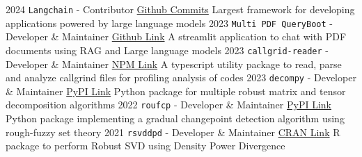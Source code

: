 \documentclass[10pt]{developercv} %
\begin{document}
\begin{entrylist}
    \entry
    {2024}
    {\texttt{Langchain} - Contributor}
    {\href{https://github.com/langchain-ai/langchain/commits?author=subroy13}{Github Commits}}
    {\small Largest framework for developing applications powered by large language models}
    \vspace*{-5pt}
    \entry
    {2023}
    {\texttt{Multi PDF QueryBoot} - Developer \& Maintainer}
    {\href{https://github.com/subroy13/multi-pdf-querybot}{Github Link}}
    {\small A streamlit application to chat with PDF documents using RAG and Large language models}
    \vspace*{-5pt}
    \entry
    {2023}
    {\texttt{callgrid-reader} - Developer \& Maintainer}
    {\href{https://www.npmjs.com/package/callgrind-reader}{NPM Link}}
    {\small A typescript utility package to read, parse and analyze callgrind files for profiling analysis of codes}
    \vspace*{-5pt}
    \entry
    {2023}
    {\texttt{decompy} - Developer \& Maintainer}
    {\href{https://pypi.org/project/decompy/}{PyPI Link}}
    {\small Python package for multiple robust matrix and tensor decomposition algorithms}
    \vspace*{-5pt}
    \entry
    {2022}
    {\texttt{roufcp} - Developer \& Maintainer}
    {\href{https://pypi.org/project/roufcp/}{PyPI Link}}
    {\small Python package implementing a gradual changepoint detection algorithm using rough-fuzzy set theory}
    \vspace*{-5pt}
    \entry
    {2021}
    {\texttt{rsvddpd} - Developer \& Maintainer}
    {\href{https://cran.r-project.org/web/packages/rsvddpd/index.html}{CRAN Link}}
    {\small R package to perform Robust SVD using Density Power Divergence}
\end{entrylist}
\end{document}
